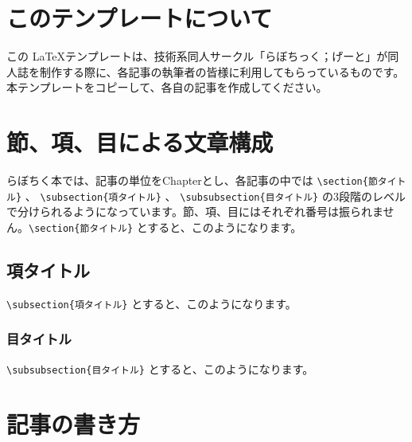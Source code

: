\section{このテンプレートについて}
この \LaTeX テンプレートは、技術系同人サークル「らぼちっく；げーと」が同人誌を制作する際に、各記事の執筆者の皆様に利用してもらっているものです。本テンプレートをコピーして、各自の記事を作成してください。

\section{節、項、目による文章構成}
らぼちく本では、記事の単位をChapterとし、各記事の中では \verb=\section{節タイトル}= 、 \verb=\subsection{項タイトル}= 、 \verb=\subsubsection{目タイトル}= の3段階のレベルで分けられるようになっています。節、項、目にはそれぞれ番号は振られません。\verb=\section{節タイトル}= とすると、このようになります。

\subsection{項タイトル}
\verb=\subsection{項タイトル}= とすると、このようになります。

\subsubsection{目タイトル}
\verb=\subsubsection{目タイトル}= とすると、このようになります。

\section{記事の書き方}
